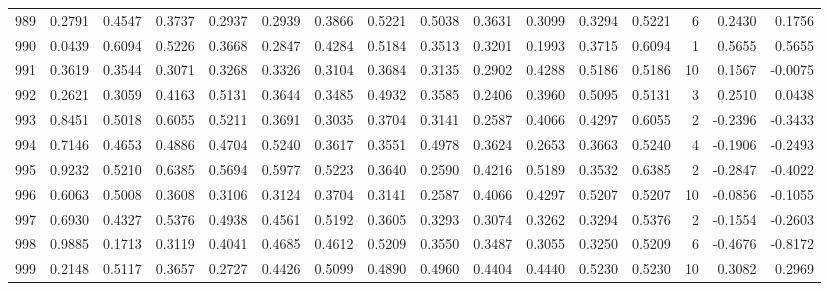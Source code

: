 \begin{tabular}{lrrrrrrrrrrrrrrr}
989 &      0.2791 &  0.4547 &  0.3737 &  0.2937 &  0.2939 &  0.3866 &  0.5221 &  0.5038 &  0.3631 &  0.3099 &   0.3294 &     0.5221 &      6 &                    0.2430 &                     0.1756 \\
990 &      0.0439 &  0.6094 &  0.5226 &  0.3668 &  0.2847 &  0.4284 &  0.5184 &  0.3513 &  0.3201 &  0.1993 &   0.3715 &     0.6094 &      1 &                    0.5655 &                     0.5655 \\
991 &      0.3619 &  0.3544 &  0.3071 &  0.3268 &  0.3326 &  0.3104 &  0.3684 &  0.3135 &  0.2902 &  0.4288 &   0.5186 &     0.5186 &     10 &                    0.1567 &                    -0.0075 \\
992 &      0.2621 &  0.3059 &  0.4163 &  0.5131 &  0.3644 &  0.3485 &  0.4932 &  0.3585 &  0.2406 &  0.3960 &   0.5095 &     0.5131 &      3 &                    0.2510 &                     0.0438 \\
993 &      0.8451 &  0.5018 &  0.6055 &  0.5211 &  0.3691 &  0.3035 &  0.3704 &  0.3141 &  0.2587 &  0.4066 &   0.4297 &     0.6055 &      2 &                   -0.2396 &                    -0.3433 \\
994 &      0.7146 &  0.4653 &  0.4886 &  0.4704 &  0.5240 &  0.3617 &  0.3551 &  0.4978 &  0.3624 &  0.2653 &   0.3663 &     0.5240 &      4 &                   -0.1906 &                    -0.2493 \\
995 &      0.9232 &  0.5210 &  0.6385 &  0.5694 &  0.5977 &  0.5223 &  0.3640 &  0.2590 &  0.4216 &  0.5189 &   0.3532 &     0.6385 &      2 &                   -0.2847 &                    -0.4022 \\
996 &      0.6063 &  0.5008 &  0.3608 &  0.3106 &  0.3124 &  0.3704 &  0.3141 &  0.2587 &  0.4066 &  0.4297 &   0.5207 &     0.5207 &     10 &                   -0.0856 &                    -0.1055 \\
997 &      0.6930 &  0.4327 &  0.5376 &  0.4938 &  0.4561 &  0.5192 &  0.3605 &  0.3293 &  0.3074 &  0.3262 &   0.3294 &     0.5376 &      2 &                   -0.1554 &                    -0.2603 \\
998 &      0.9885 &  0.1713 &  0.3119 &  0.4041 &  0.4685 &  0.4612 &  0.5209 &  0.3550 &  0.3487 &  0.3055 &   0.3250 &     0.5209 &      6 &                   -0.4676 &                    -0.8172 \\
999 &      0.2148 &  0.5117 &  0.3657 &  0.2727 &  0.4426 &  0.5099 &  0.4890 &  0.4960 &  0.4404 &  0.4440 &   0.5230 &     0.5230 &     10 &                    0.3082 &                     0.2969 \\
\bottomrule
\end{tabular}
